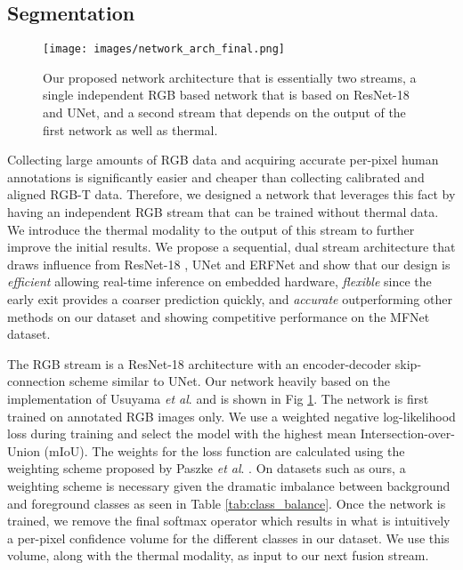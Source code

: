 \documentclass[letterpaper, 10 pt, conference]{ieeeconf}
\newcommand{\etal}{\textit{et al}. }
\begin{document}
\subsection{Segmentation}

\begin{figure}[t]
\begin{center}
\texttt{[image: images/network\_arch\_final.png]}
\end{center}
   \caption{Our proposed network architecture that is essentially two streams, a single independent RGB based network that is based on ResNet-18 and UNet, and a second stream that depends on the output of the first network as well as thermal.}
\label{fig:pst_network}
\vspace{-0.45cm}
\end{figure}

Collecting large amounts of RGB data and acquiring accurate per-pixel human annotations is significantly easier and cheaper than collecting calibrated and aligned RGB-T data. Therefore, we designed a network that leverages this fact by having an independent RGB stream that can be trained without thermal data. We introduce the thermal modality to the output of this stream to further improve the initial results. We propose a sequential, dual stream architecture that draws influence from ResNet-18 \cite{he2016deep}, UNet \cite{ronneberger2015u} and ERFNet \cite{romera2017erfnet} and show that our design is \textit{efficient} allowing real-time inference on embedded hardware, \textit{flexible} since the early exit provides a coarser prediction quickly, and \textit{accurate} outperforming other methods on our dataset and showing competitive performance on the MFNet dataset.

The RGB stream is a ResNet-18 architecture with an encoder-decoder skip-connection scheme similar to UNet. Our network heavily based on the implementation of Usuyama \etal \cite{usuyama} and is shown in Fig \ref{fig:pst_network}. The network is first trained on annotated RGB images only. We use a weighted negative log-likelihood loss during training and select the model with the highest mean Intersection-over-Union (mIoU). The weights for the loss function are calculated using the weighting scheme proposed by Paszke \etal \cite{paszke2016enet}. On datasets such as ours, a weighting scheme is necessary given the dramatic imbalance between background and foreground classes as seen in Table \ref{tab:class_balance}. Once the network is trained, we remove the final softmax operator which results in what is intuitively a per-pixel confidence volume for the different classes in our dataset. We use this volume, along with the thermal modality, as input to our next fusion stream.    
\end{document}
